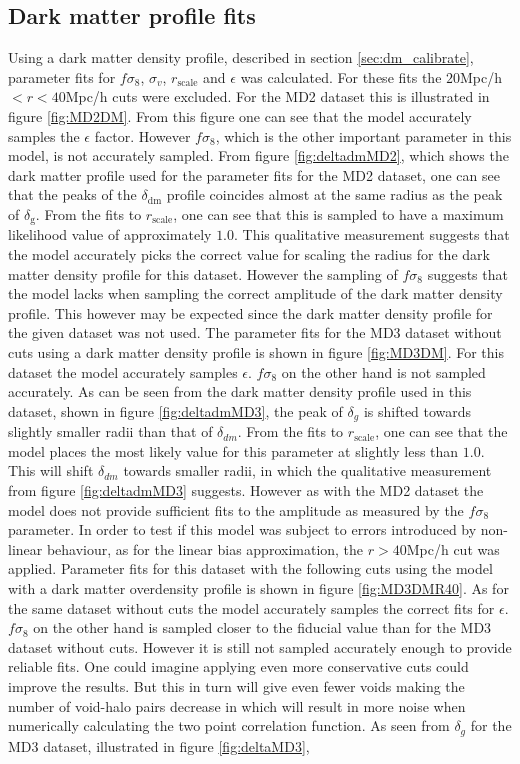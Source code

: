 \subsection{Dark matter profile fits}
Using a dark matter density profile, described in section \ref{sec:dm_calibrate}, parameter fits for $f\sigma_8$, $\sigma_v$, $r_\mathrm{scale}$ and $\epsilon$ was calculated. For these fits the $20$Mpc/h$<r<40$Mpc/h cuts were excluded. For the MD2 dataset this is illustrated in figure \ref{fig:MD2DM}. From this figure one can see that the model accurately samples the $\epsilon$ factor. However $f\sigma_8$, which is the other important parameter in this model, is not accurately sampled. From figure \ref{fig:deltadmMD2}, which shows the dark matter profile used for the parameter fits for the MD2 dataset, one can see that the peaks of the $\delta_{\mathrm{dm}}$ profile coincides almost at the same radius as the peak of $\delta_\mathrm{g}$. From the fits to $r_\mathrm{scale}$, one can see that this is sampled to have a maximum likelihood value of approximately $1.0$. This qualitative measurement suggests that the model accurately picks the correct value for scaling the radius for the dark matter density profile for this dataset. However the sampling of $f\sigma_8$ suggests that the model lacks when sampling the correct amplitude of the dark matter density profile. This however may be expected since the dark matter density profile for the given dataset was not used. The parameter fits for the MD3 dataset without cuts using a dark matter density profile is shown in figure \ref{fig:MD3DM}. For this dataset the model accurately samples $\epsilon$. $f\sigma_8$ on the other hand is not sampled accurately. As can be seen from the dark matter density profile used in this dataset, shown in figure \ref{fig:deltadmMD3}, the peak of $\delta_g$ is shifted towards slightly smaller radii than that of $\delta_{dm}$. From the fits to $r_{\mathrm{scale}}$, one can see that the model places the most likely value for this parameter at slightly less than $1.0$. This will shift $\delta_{dm}$ towards smaller radii, in which the qualitative measurement from figure \ref{fig:deltadmMD3} suggests. However as with the MD2 dataset the model does not provide sufficient fits to the amplitude as measured by the $f\sigma_8$ parameter. In order to test if this model was subject to errors introduced by non-linear behaviour, as for the linear bias approximation, the $r>40$Mpc/h cut was applied. Parameter fits for this dataset with the following cuts using the model with a dark matter overdensity profile is shown in figure \ref{fig:MD3DMR40}. As for the same dataset without cuts the model accurately samples the correct fits for $\epsilon$. $f\sigma_8$ on the other hand is sampled closer to the fiducial value than for the MD3 dataset without cuts. However it is still not sampled accurately enough to provide reliable fits. One could imagine applying even more conservative cuts could improve the results. But this in turn will give even fewer voids making the number of void-halo pairs decrease in which will result in more noise when numerically calculating the two point correlation function. As seen from $\delta_g$ for the MD3 dataset, illustrated in figure \ref{fig:deltaMD3}, 